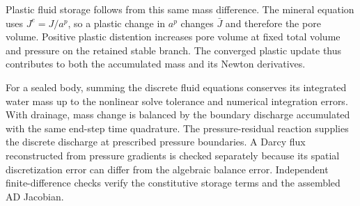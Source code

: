 Plastic fluid storage follows from this same mass difference.
The mineral equation uses \(J^e=J/a^p\), so a plastic change in
\(a^p\) changes \(\bar J\) and therefore the pore volume.
Positive plastic distention increases pore volume at fixed total volume
and pressure on the retained stable branch.  The converged plastic update
thus contributes to both the accumulated mass and its Newton derivatives.

For a sealed body, summing the discrete fluid equations conserves its
integrated water mass up to the nonlinear solve tolerance and numerical
integration errors.  With drainage, mass change is balanced by the
boundary discharge accumulated with the same end-step time quadrature.
The pressure-residual reaction supplies the discrete discharge at prescribed
pressure boundaries.  A Darcy flux reconstructed from pressure gradients is
checked separately because its spatial discretization error can differ from
the algebraic balance error.  Independent finite-difference checks verify
the constitutive storage terms and the assembled AD Jacobian.
